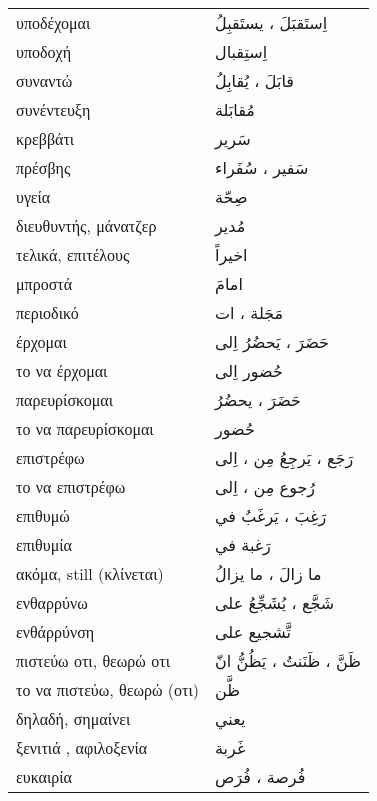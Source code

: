\documentclass[twocolumn,a4paper]{article}
\newcommand{\ar}[1]{\textarabic{#1}}
\newcommand{\pl}{\raisebox{0.15ex}{\footnotesize ◍}}
\newcommand{\normpl}[1]{\ar{ #1، ات }}
\newcommand{\vrf}{\raisebox{0.15ex}{\footnotesize ◉}}
\newcommand{\mas}{\raisebox{0.15ex}{\footnotesize ◫}}
\begin{document}
\begin{mpsupertabular}{ P{0.5\textwidth} P{0.5\textwidth} }
υποδέχομαι \vrf              & \ar{ اِستَقبَلَ ، يستَقبِلُ } \\
υποδοχή \mas                 & \ar{ اِستِقبال } \\
συναντώ \vrf                 & \ar{ قابَلَ ، يُقابِلُ } \\
συνέντευξη \mas              & \ar{ مُقابَلة } \\
κρεββάτι                     & \ar{ سَرير } \\
πρέσβης \pl                  & \ar{ سَفير ، سُفَراء } \\
υγεία                        & \ar{ صِحّة } \\
διευθυντής, μάνατζερ         & \ar{ مُدير } \\

τελικά, επιτέλους            & \ar{ اخيراً } \\
μπροστά                      & \ar{ امامَ } \\
περιοδικό \pl                & \normpl{ مَجَلة } \\
έρχομαι \vrf                 & \ar{ حَضَرَ ، يَحضُرُ اِلى } \\
το να έρχομαι \mas           & \ar{ حُضور اِلى } \\
παρευρίσκομαι \vrf           & \ar{ حَضَرَ ، يحضُرُ } \\
το να παρευρίσκομαι \mas     & \ar{ حُضور } \\
επιστρέφω \vrf               & \ar{ رَجَع ، يَرجِعُ مِن ، اِلى } \\
το να επιστρέφω \mas         & \ar{ رُجوع مِن ، اِلى } \\
επιθυμώ \vrf                 & \ar{ رَغِبَ ، يَرغَبُ في } \\
επιθυμία \mas                & \ar{ رَغبة في } \\
ακόμα, still (κλίνεται)      & \ar{ ما زالَ ، ما يزالُ } \\ %
ενθαρρύνω \vrf               & \ar{ شَجَّع ، يُشَجِّعُ على } \\
ενθάρρύνση \mas              & \ar{ تَّشجيع على } \\
πιστεύω οτι, θεωρώ οτι \vrf  & \ar{ ظَنَّ ، ظَنَنتُ ، يَظُنُّ انّ } \\
το να πιστεύω, θεωρώ (οτι) \mas    & \ar{ ظَّن } \\
δηλαδή, σημαίνει             & \ar{ يعني } \\
ξενιτιά , αφιλοξενία         & \ar{ غَربة } \\
ευκαιρία \pl                 & \ar{ فُرصة ، فُرَص } \\

\end{mpsupertabular}
\end{document}
